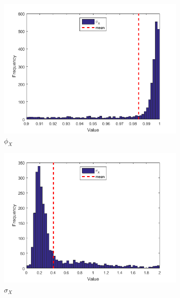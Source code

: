 \documentclass[11pt,a4,twosided,singlespacing,titlepagenumber=on]{scrreprt}
\numberwithin{equation}{chapter} %
\theoremstyle{remark}
\begin{document}
\begin{figure}[H]
    \centering
    \begin{subfigure}[t]{0.32\textwidth}
        \centering
        \includegraphics[width=1\textwidth]{res/params/4384_5114/1}
        \caption{$\phi_X$}
    \end{subfigure}
    \begin{subfigure}[t]{0.32\textwidth}
        \centering
        \includegraphics[width=1\textwidth]{res/params/4384_5114/2}
        \caption{$\sigma_X$}
    \end{subfigure}
    \begin{subfigure}[t]{0.32\textwidth}
        \centering

\end{subfigure}
\end{figure}
\end{document}
